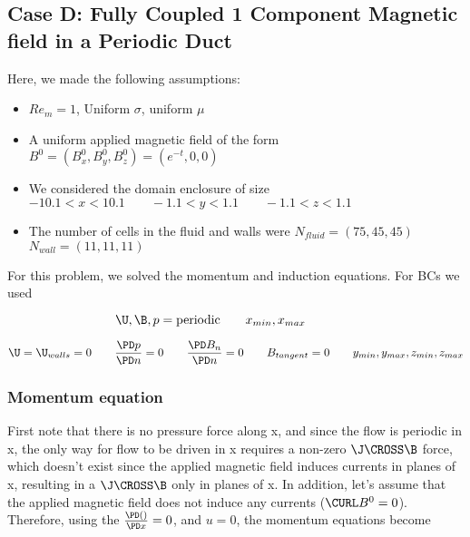 \documentclass[11pt]{article}
\begin{document}

\subsection{Case D: Fully Coupled 1 Component Magnetic field in a Periodic Duct}

Here, we made the following assumptions:

\begin{itemize}
\item $Re_m = 1$, Uniform $\sigma$, uniform $\mu$
\item A uniform applied magnetic field of the form $B^0 = (B_x^0,B_y^0,B_z^0) = (e^{-t},0,0)$
\item We considered the domain enclosure of size $-10.1 < x < 10.1 \qquad -1.1 < y < 1.1 \qquad -1.1 < z < 1.1$
\item The number of cells in the fluid and walls were $N_{fluid} = (75,45,45)$ \qquad $N_{wall} = (11,11,11)$
\end{itemize}

For this problem, we solved the momentum and induction equations. For BCs we used

\begin{equation}
	\U,
	\B,
	p = \text{periodic}
	\qquad
	x_{min},x_{max}
	\qquad \qquad
\end{equation}

\begin{equation}
	\U = \U_{walls} = 0
	\qquad
	\frac{\PD p}{\PD n} = 0
	\qquad
	\frac{\PD B_{n}}{\PD n} = 0
	\qquad
	B_{tangent} = 0
	\qquad
	y_{min},y_{max},
	z_{min},z_{max}
\end{equation}

\subsubsection{Momentum equation}

First note that there is no pressure force along x, and since the flow is periodic in x, the only way for flow to be driven in x requires a non-zero $\J \CROSS \B$ force, which doesn't exist since the applied magnetic field induces currents in planes of x, resulting in a $\J \CROSS \B$ only in planes of x. In addition, let's assume that the applied magnetic field does not induce any currents ($\CURL B^0=0$). Therefore, using the $\frac{\PD ()}{\PD x} = 0$, and $u = 0$, the momentum equations become
\end{document}
